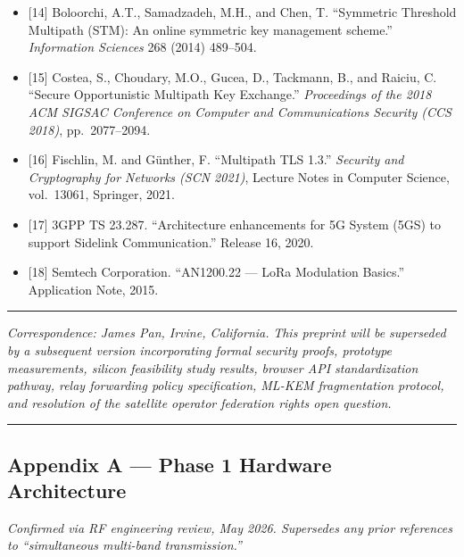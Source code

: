 \documentclass[
  11pt,
]{article}
\begin{document}
\begin{itemize}
  {[}13{]} Dorsey, J. et al.~``Bitchat.'' Open-source BLE mesh messaging
  application, released July 2025. Source:
  \url{https://github.com/jackjackbits/bitchat}. Operational deployment
  record: Madagascar, Nepal, Uganda, Iran (2025--2026).
\item
  {[}14{]} Boloorchi, A.T., Samadzadeh, M.H., and Chen, T. ``Symmetric
  Threshold Multipath (STM): An online symmetric key management
  scheme.'' \emph{Information Sciences} 268 (2014) 489--504.
\item
  {[}15{]} Costea, S., Choudary, M.O., Gucea, D., Tackmann, B., and
  Raiciu, C. ``Secure Opportunistic Multipath Key Exchange.''
  \emph{Proceedings of the 2018 ACM SIGSAC Conference on Computer and
  Communications Security (CCS 2018)}, pp.~2077--2094.
\item
  {[}16{]} Fischlin, M. and Günther, F. ``Multipath TLS 1.3.''
  \emph{Security and Cryptography for Networks (SCN 2021)}, Lecture
  Notes in Computer Science, vol.~13061, Springer, 2021.
\item
  {[}17{]} 3GPP TS 23.287. ``Architecture enhancements for 5G System
  (5GS) to support Sidelink Communication.'' Release 16, 2020.
\item
  {[}18{]} Semtech Corporation. ``AN1200.22 --- LoRa Modulation
  Basics.'' Application Note, 2015.
\end{itemize}

\begin{center}\rule{0.5\linewidth}{0.5pt}\end{center}

\emph{Correspondence: James Pan, Irvine, California.} \emph{This
preprint will be superseded by a subsequent version incorporating formal
security proofs, prototype measurements, silicon feasibility study
results, browser API standardization pathway, relay forwarding policy
specification, ML-KEM fragmentation protocol, and resolution of the
satellite operator federation rights open question.}

\begin{center}\rule{0.5\linewidth}{0.5pt}\end{center}

\hypertarget{appendix-a-phase-1-hardware-architecture}{%
\subsection{Appendix A --- Phase 1 Hardware
Architecture}\label{appendix-a-phase-1-hardware-architecture}}

\emph{Confirmed via RF engineering review, May 2026. Supersedes any
prior references to ``simultaneous multi-band transmission.''}
\end{document}
